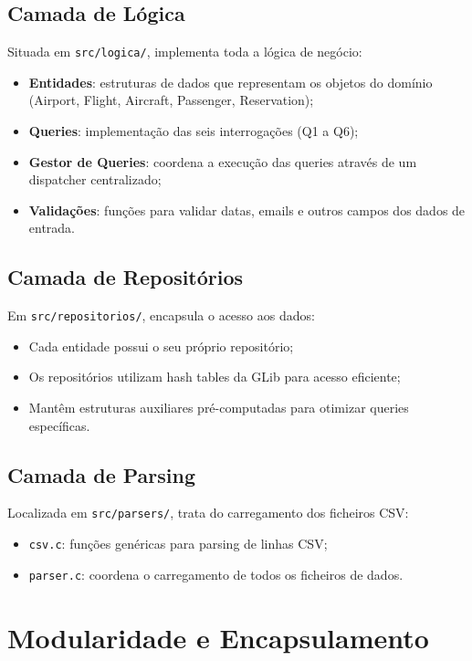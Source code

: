 \documentclass[a4paper,12pt]{scrreprt}
\begin{document}
\subsection{Camada de Lógica}

Situada em \texttt{src/logica/}, implementa toda a lógica de negócio:
\begin{itemize}
    \item \textbf{Entidades}: estruturas de dados que representam os objetos do domínio (Airport, Flight, Aircraft, Passenger, Reservation);
    \item \textbf{Queries}: implementação das seis interrogações (Q1 a Q6);
    \item \textbf{Gestor de Queries}: coordena a execução das queries através de um dispatcher centralizado;
    \item \textbf{Validações}: funções para validar datas, emails e outros campos dos dados de entrada.
\end{itemize}

\subsection{Camada de Repositórios}

Em \texttt{src/repositorios/}, encapsula o acesso aos dados:
\begin{itemize}
    \item Cada entidade possui o seu próprio repositório;
    \item Os repositórios utilizam hash tables da GLib para acesso eficiente;
    \item Mantêm estruturas auxiliares pré-computadas para otimizar queries específicas.
\end{itemize}

\subsection{Camada de Parsing}

Localizada em \texttt{src/parsers/}, trata do carregamento dos ficheiros CSV:
\begin{itemize}
    \item \texttt{csv.c}: funções genéricas para parsing de linhas CSV;
    \item \texttt{parser.c}: coordena o carregamento de todos os ficheiros de dados.
\end{itemize}

\section{Modularidade e Encapsulamento}
\end{document}
